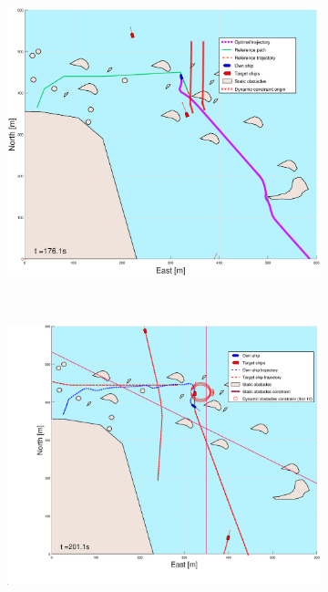 \begin{figure}[ht]
\begin{subfigure}[b]{0.494\textwidth}
        \subcaption{}
    \end{subfigure}
    \hfill
    \begin{subfigure}[b]{0.494\textwidth}
        \centering
        \includegraphics[width=\textwidth]{Images/Figures/skjergard_m_trafikk_NEW/_Simple_0fig999_time=176}
        \subcaption{}
    \end{subfigure}
    \hfill
    \\
    \begin{subfigure}[b]{0.494\textwidth}
        \centering
        \includegraphics[width=\textwidth]{Images/Figures/skjergard_m_trafikk_NEW/_Simple_0fig1_time=201}

\end{subfigure}
\end{figure}
